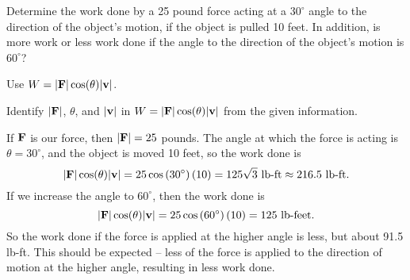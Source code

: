 \begin{activity} \label{A:9.3.1}  Determine the work done by a 25 pound force acting at a $30^{\circ}$ angle to the direction of the object's motion, if the object is pulled 10 feet.  In addition, is more work or less work done if the angle to the direction of the object's motion is $60^\circ$?
\end{activity}
\begin{smallhint}
Use $W = |\mathbf{F}| \cos(\theta) |\mathbf{v}|$.
\end{smallhint}
\begin{bighint}
Identify $|\mathbf{F}|$, $\theta$, and $|\mathbf{v}|$ in $W = |\mathbf{F}| \cos(\theta) |\mathbf{v}|$ from the given information.
\end{bighint}
\begin{activitySolution}
If $\mathbf{F}$ is our force, then $|\mathbf{F}| = 25$ pounds. The angle at which the force is acting is $\theta = 30^{\circ}$, and the object is moved 10 feet, so the work done is  
\[|\mathbf{F}| \cos(\theta) |\mathbf{v}| = 25 \cos\left(30^{\circ}\right)(10) = 125 \sqrt{3} \text{ lb-ft} \approx 216.5 \text{ lb-ft}.\]
If we increase the angle to $60^{\circ}$, then the work done is
\[|\mathbf{F}| \cos(\theta) |\mathbf{v}| = 25 \cos\left(60^{\circ}\right)(10) = 125 \text{ lb-feet}.\]
So the work done if the force is applied at the higher angle is less, but about 91.5 lb-ft. This should be expected -- less of the force is applied to the direction of motion at the higher angle, resulting in less work done.  
\end{activitySolution}
\aftera
